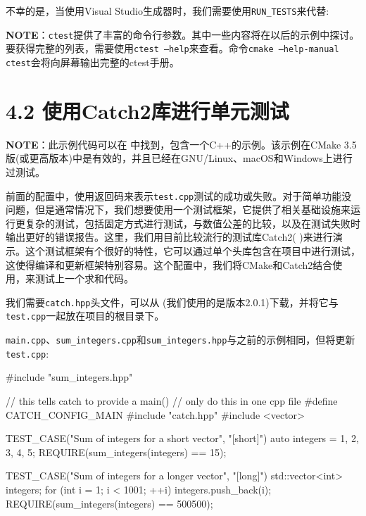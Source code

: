 不幸的是，当使用Visual Studio生成器时，我们需要使用\texttt{RUN\_TESTS}来代替:


\begin{myInfoBox}
\textbf{NOTE}：\texttt{ctest}提供了丰富的命令行参数。其中一些内容将在以后的示例中探讨。要获得完整的列表，需要使用\texttt{ctest --help}来查看。命令\texttt{cmake --help-manual ctest}会将向屏幕输出完整的ctest手册。
\end{myInfoBox}


\section{4.2 使用Catch2库进行单元测试}

\begin{myInfoBox}
\textbf{NOTE}：此示例代码可以在  中找到，包含一个C++的示例。该示例在CMake 3.5版(或更高版本)中是有效的，并且已经在GNU/Linux、macOS和Windows上进行过测试。
\end{myInfoBox}

前面的配置中，使用返回码来表示\texttt{test.cpp}测试的成功或失败。对于简单功能没问题，但是通常情况下，我们想要使用一个测试框架，它提供了相关基础设施来运行更复杂的测试，包括固定方式进行测试，与数值公差的比较，以及在测试失败时输出更好的错误报告。这里，我们用目前比较流行的测试库Catch2(  )来进行演示。这个测试框架有个很好的特性，它可以通过单个头库包含在项目中进行测试，这使得编译和更新框架特别容易。这个配置中，我们将CMake和Catch2结合使用，来测试上一个求和代码。

我们需要\texttt{catch.hpp}头文件，可以从  (我们使用的是版本2.0.1)下载，并将它与\texttt{test.cpp}一起放在项目的根目录下。


\texttt{main.cpp}、\texttt{sum\_integers.cpp}和\texttt{sum\_integers.hpp}与之前的示例相同，但将更新\texttt{test.cpp}:

\begin{codebox}[cpp]
#include "sum_integers.hpp"

// this tells catch to provide a main()
// only do this in one cpp file
#define CATCH_CONFIG_MAIN
#include "catch.hpp"
#include <vector>

TEST_CASE("Sum of integers for a short vector", "[short]")
{
  auto integers = {1, 2, 3, 4, 5};
  REQUIRE(sum_integers(integers) == 15);
}

TEST_CASE("Sum of integers for a longer vector", "[long]")
{
  std::vector<int> integers;
  for (int i = 1; i < 1001; ++i)
  {
    integers.push_back(i);
  }
  REQUIRE(sum_integers(integers) == 500500);
}
\end{codebox}

